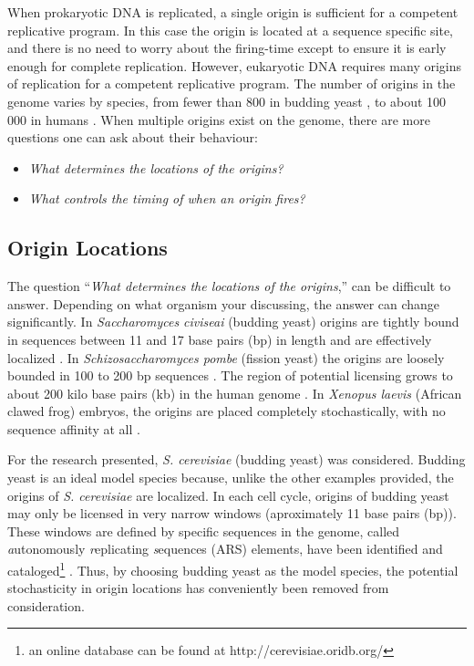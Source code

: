 	When prokaryotic DNA is replicated, a single origin is sufficient for a competent replicative program.
	In this case the origin is located at a sequence specific site, and there is no need to worry about the firing-time except to ensure it is early enough for complete replication.
	However, eukaryotic DNA requires many origins of replication for a competent replicative program.
	The number of origins in the genome varies by species, from fewer than 800 in budding yeast \cite{OriDB}, to about 100 000 in humans \cite{OriginsReview}.
	When multiple origins exist on the genome, there are more questions one can ask about their behaviour:
	\begin{itemize}
		\item \emph{What determines the locations of the origins?}
		\item \emph{What controls the timing of when an origin fires?}
	\end{itemize}
	
		\subsection{Origin Locations}
		\label{subsec:OriginLocations}
		
		The question ``\emph{What determines the locations of the origins},'' can be difficult to answer.
		Depending on what organism your discussing, the answer can change significantly.
		In \emph{Saccharomyces civiseai} (budding yeast) origins are tightly bound in sequences between 11 and 17 base pairs (bp) in length and are effectively localized \cite{ScottsPaper}.
		In \emph{Schizosaccharomyces pombe} (fission yeast) the origins are loosely bounded in 100 to 200 bp sequences \cite{OriginsReview}.
		The region of potential licensing grows to about 200 kilo base pairs (kb) in the human genome \cite{HumanGenome}.
		In \emph{Xenopus laevis} (African clawed frog) embryos, the origins are placed completely stochastically, with no sequence affinity at all \cite{FrogEmbryo}.
		
		For the research presented, \emph{S. cerevisiae} (budding yeast) was considered.
		Budding yeast is an ideal model species because, unlike the other examples provided, the origins of \emph{S. cerevisiae} are localized.
		In each cell cycle, origins of budding yeast may only be licensed in very narrow windows (aproximately 11 base pairs (bp)).
		These windows are defined by specific sequences in the genome, called \emph{a}utonomously \emph{r}eplicating \emph{s}equences (ARS) elements, have been identified and cataloged\footnote{an online database can be found at http://cerevisiae.oridb.org/} \cite{OriDB}.
		Thus, by choosing budding yeast as the model species, the potential stochasticity in origin locations has conveniently been removed from consideration.
		
